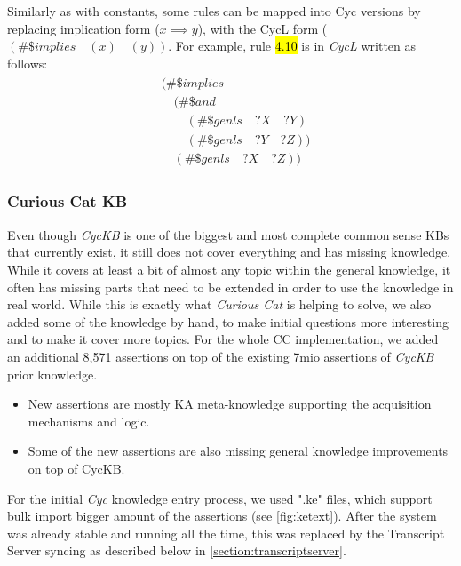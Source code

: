 Similarly as with constants, some rules can be mapped into Cyc versions by 
replacing implication form ($x \implies y$), with the CycL form 
($(\#\$implies\quad (x) \quad (y))$. For example, rule \hl{4.10} is in
 \emph{CycL} written as follows:
\begin{equation}\label{as:cycrule}
\begin{gathered}
\begin{aligned}
&(\#\$implies\\
	&\quad(\#\$and\\
		&\qquad(\#\$genls\quad?X\quad?Y)\\
		&\qquad(\#\$genls\quad?Y\quad?Z))\\
	&\quad(\#\$genls\quad?X\quad?Z))
\end{aligned}
\end{gathered}
\end{equation}

\subsubsection{Curious Cat KB}
\label{section:cckb}
Even though \emph{CycKB} is one of the biggest and most complete common sense 
KBs that currently exist, it still does not cover everything and has missing 
knowledge. While it covers at least a bit of almost any topic within the general
knowledge, it often has missing parts that need to be extended in order to use
the knowledge in real world. While this is exactly what \emph{Curious Cat} is
helping to solve, we also added some of the knowledge by hand, to make initial
questions more interesting and to make it cover more topics. For the whole CC
implementation, we added an additional 8,571 assertions on top of the existing 
7mio assertions of \emph{CycKB} prior knowledge.
\begin{itemize}
\item New assertions are mostly KA meta-knowledge supporting the acquisition
mechanisms and logic.
\item Some of the new assertions are also missing general knowledge 
improvements on top of CycKB.
\end{itemize}

For the initial \emph{Cyc} knowledge entry process, we used ".ke" files, 
which support bulk import bigger amount of the assertions (see 
\autoref{fig:ketext}). After the system was already stable and running all the
time, this was replaced by the Transcript Server syncing as described below
in \autoref{section:transcriptserver}.

